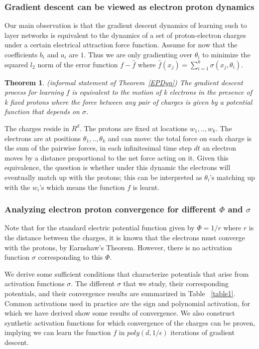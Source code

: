\documentclass{article}
\newtheorem{theorem}{Theorem}[section]
\begin{document}
\subsubsection{Gradient descent can be viewed as electron proton dynamics}
Our main observation is that the gradient descent dynamics of learning such to layer networks is equivalent to the dynamics of a set of proton-electron charges under a certain electrical attraction force function. Assume for now that the coefficients $b_i$ and $a_i$ are $1$. Thus we are only gradienting over $\theta_i$ to minimize the squared $l_2$ norm of the error function $f-\widehat{f}$ where $\widehat{f}(x_j) = \sum_{i=1}^k  \sigma(x_j,\theta_i)$.

\begin{theorem}(informal statement of Theorem~\ref{EPDyn})
The gradient descent process for learning $f$ is equivalent to the motion of k electrons in the presence of k fixed protons where the force between any pair of charges is given by a potential function that depends on $\sigma$.
\end{theorem}

The charges reside in $R^d$. The protons are fixed at locations $w_1,..,w_k$. The electrons are at positions $\theta_1,..,\theta_k$ and can move: the total force on each charge is the sum of the pairwise forces, in each infinitesimal time step $dt$ an electron moves by a distance proportional to the net force acting on it. Given this equivalence, the question is whether under this dynamic the electrons will eventually match up with the protons; this can be interpreted as $\theta_i$'s matching up with the $w_i$'s which means the function $f$ is learnt. 

\subsubsection{Analyzing electron proton convergence for different $\Phi$ and $\sigma$}

Note that for the standard electric potential function given by $\Phi = 1/r$ where $r$ is the distance between the charges, it is known that the electrons must converge with the protons, by Earnshaw's Theorem. However, there is no activation function $\sigma$ corresponding to this $\Phi$. 

We derive some sufficient conditions that characterize potentials that arise from activation functions $\sigma$. The different $\sigma$ that we study, their corresponding potentials, and their convergence results are summarized in Table ~\ref{table1}. Common activations used in practice are the sign and polynomial activation, for which we have derived show some results of convergence. We also construct synthetic activation functions for which convergence of the charges can be proven, implying we can learn the function $f$ in $poly(d,1/\epsilon)$ iterations of gradient descent.
\end{document}
